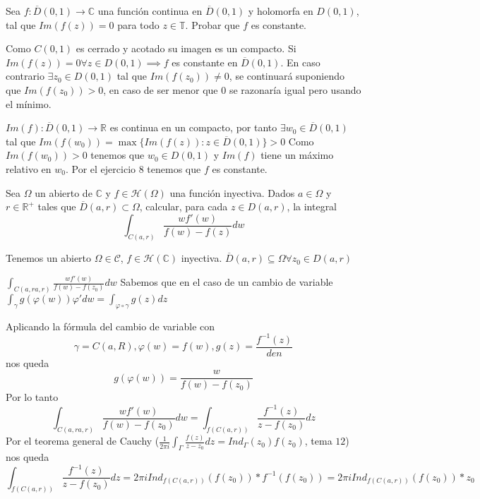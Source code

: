 \begin{ejer}
	Sea $f:\overline{D}(0,1)\rightarrow\mathbb{C}$ una función continua en $\overline{D}(0,1)$ y holomorfa en $D(0,1)$, tal que $Im(f(z)) = 0$ para todo $z\in\mathbb{T}$.
	Probar que $f$ es constante.
\end{ejer}
\begin{sol}
Como $C(0,1)$ es cerrado y acotado su imagen es un compacto.
Si $Im(f(z))=0 	\forall z\in D(0,1) \implies f$ es constante en $\overline{D}(0,1)$.
En caso contrario $\exists z_0 \in D(0,1)$ tal que $Im(f(z_0)) \not=0$, se continuará suponiendo que $Im(f(z_0))>0$, en caso de ser menor que $0$ se razonaría igual pero usando el mínimo.

$Im(f):\overline{D}(0,1)\rightarrow \mathbb{R}$ es continua en un compacto, por tanto $\exists w_0\in\overline{D}(0,1)$ tal que $Im(f(w_0)) = \max\{ Im(f(z)) : z\in\overline{D}(0,1) \} > 0$
Como $Im(f(w_0))>0$ tenemos que $w_0\in D(0,1)$ y $Im(f)$ tiene un máximo relativo en $w_0$.
Por el ejercicio $8$ tenemos que $f$ es constante.
\end{sol}


\begin{ejer}
	Sea $\Omega$ un abierto de $\mathbb{C}$ y $f\in\mathcal{H}(\Omega)$ una función inyectiva. 
	Dados $a\in\Omega$ y $r\in\mathbb{R}^+$ tales que $\overline{D}(a,r)\subset\Omega$, calcular, para cada $z\in D(a,r)$, la integral
	$$ \int_{C(a,r)} \frac{wf'(w)}{f(w)-f(z)} dw $$
\end{ejer}
\begin{sol}
Tenemos un abierto $\Omega\in\mathcal{C}$, $f\in\mathcal{H}(\mathbb{C})$ inyectiva.
$\overline{D}(a,r) \subseteq \Omega \forall z_0\in D(a,r)$

$\int_{C(a,ra,r)} \frac{wf'(w)}{f(w)-f(z_0)} dw$
Sabemos que en el caso de un cambio de variable
$\int_{\gamma}g(\varphi(w))\varphi' dw =\int_{\varphi \circ \gamma} g(z)dz $

Aplicando la fórmula del cambio de variable con 
$$\gamma = C(a,R), \varphi(w) = f(w), g(z) = \frac{f^{-1}(z)}{den}$$
nos queda
$$g(\varphi(w)) = \frac{w}{f(w)-f(z_0)}$$
Por lo tanto
$$\int_{C(a,ra,r)} \frac{wf'(w)}{f(w)-f(z_0)} dw = \int_{f(C(a,r))} \frac{f^{-1}(z)}{z-f(z_0)} dz$$
Por el teorema general de Cauchy ($\frac{1}{2\pi i} \int_{\Gamma}\frac{f(z)}{z-z_0} dz = Ind_{\Gamma} (z_0)f(z_0)$, tema $12$) nos queda
$$\int_{f(C(a,r))} \frac{f^{-1}(z)}{z-f(z_0)} dz = 2\pi i Ind_{f(C(a,r))} (f(z_0)) * f^{-1}(f(z_0)) = 2\pi i Ind_{f(C(a,r))} (f(z_0)) * z_0$$
\end{sol}